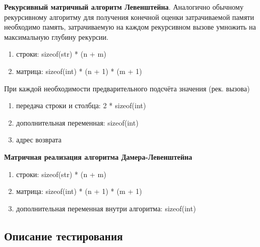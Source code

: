 \documentclass[12pt,a4paper]{article}
\begin{document}
\textbf{Рекурсивный матричный алгоритм Левенштейна}. Аналогично обычному рекурсивному алгоритму для получения конечной оценки затрачиваемой памяти необходимо память, затрачиваемую на каждом рекурсивном вызове умножить на максимальную глубину рекурсии.
\begin{enumerate}
	\item строки: sizeof(str) * (n + m)
	\item матрица: sizeof(int) * (n + 1) * (m + 1)
\end{enumerate}
При каждой необходимости предварительного подсчёта значения (рек. вызова)
\begin{enumerate}
	\item передача строки и столбца: 2 * sizeof(int)
	\item дополнительная переменная: sizeof(int)
	\item адрес возврата
\end{enumerate}

\textbf{Матричная реализация алгоритма Дамера-Левенштейна}
\begin{enumerate}
	\item строки: sizeof(str) * (n + m)
	\item матрица: sizeof(int) * (n + 1) * (m + 1)
	\item дополнительная переменная внутри алгоритма: sizeof(int)
\end{enumerate}

\subsection{Описание тестирования} %
\end{document}
